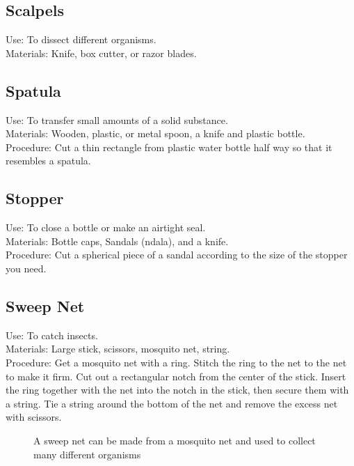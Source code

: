 \subsection*{Scalpels}


Use: To dissect different organisms. \\
Materials: Knife, box cutter, or razor blades.\\


\subsection*{Spatula}


Use: To transfer small amounts of a solid substance.\\
Materials: Wooden, plastic, or metal spoon, a knife and plastic bottle.\\
Procedure: Cut a thin rectangle from plastic water bottle half way so that it resembles a spatula.\\


\subsection*{Stopper}


Use: To close a bottle or make an airtight seal.\\
Materials: Bottle caps, Sandals (ndala), and a knife.\\
Procedure: Cut a spherical piece of a sandal according to the size of the stopper you need.\\


\subsection*{Sweep Net}


Use: To catch insects.\\
Materials: Large stick, scissors, mosquito net, string.\\
Procedure: Get a mosquito net with a ring. Stitch the ring to the net to the net to make it firm. Cut out a rectangular notch from the center of the stick. Insert the ring together with the net into the notch in the stick, then secure them with a string. Tie a string around the bottom of the net and remove the excess net with scissors.\\

\begin{figure}[H]
\begin{center}
\def\svgwidth{9cm}

\caption{A sweep net can be made from a mosquito net and used to collect many different organisms}
\label{fig:butterfly-net}
\end{center}
\end{figure}


